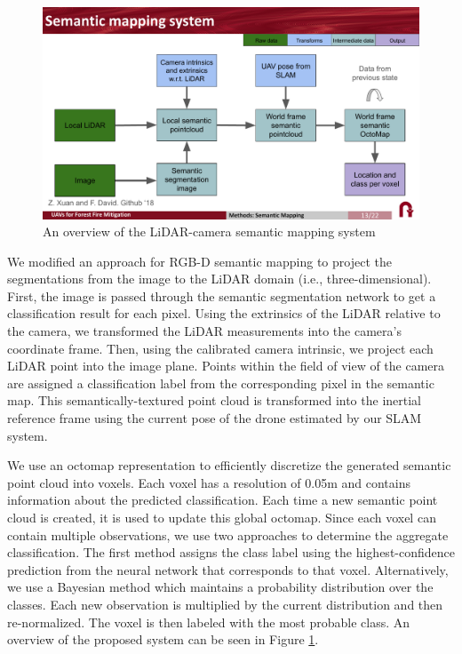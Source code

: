 \begin{figure}
    \centering
    \includegraphics[width=\textwidth, clip, trim={0 1.5cm 0 1.8cm}]{figs/methods/semantic_mapping/semantic_mapping_overview.pdf}
    \caption{An overview of the LiDAR-camera semantic mapping system}
    \label{fig:methods:lidar-camera-semantic-mapping}
\end{figure}

We modified an approach for RGB-D semantic mapping \cite{semantic_slam} to project the segmentations from the image to the LiDAR domain (i.e., three-dimensional). First, the image is passed through the semantic segmentation network to get a classification result for each pixel. Using the extrinsics of the LiDAR relative to the camera, we transformed the LiDAR measurements into the camera's coordinate frame. Then, using the calibrated camera intrinsic, we project each LiDAR point into the image plane. Points within the field of view of the camera are assigned a classification label from the corresponding pixel in the semantic map. This semantically-textured point cloud is transformed into the inertial reference frame using the current pose of the drone estimated by our SLAM system. 

We use an octomap \cite{hornung13auro} representation to efficiently discretize the generated semantic point cloud into voxels. Each voxel has a resolution of 0.05m and contains information about the predicted classification. Each time a new semantic point cloud is created, it is used to update this global octomap. Since each voxel can contain multiple observations, we use two approaches to determine the aggregate classification. The first method assigns the class label using the highest-confidence prediction from the neural network that corresponds to that voxel. Alternatively, we use a Bayesian method which maintains a probability distribution over the classes. Each new observation is multiplied by the current distribution and then re-normalized. The voxel is then labeled with the most probable class. An overview of the proposed system can be seen in Figure \ref{fig:methods:lidar-camera-semantic-mapping}.

